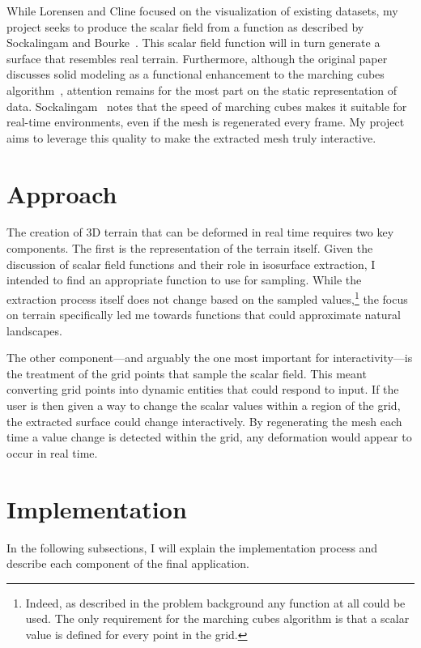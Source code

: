 \documentclass[pageno]{jpaper}
\begin{document}
While Lorensen and Cline focused on the visualization of existing datasets, my project seeks to produce the scalar field from a function as described by Sockalingam and Bourke~\cite{kieran,bourke}. This scalar field function will in turn generate a surface that resembles real terrain. Furthermore, although the original paper discusses solid modeling as a functional enhancement to the marching cubes algorithm~\cite{lorensen}, attention remains for the most part on the static representation of data. Sockalingam~\cite{kieran} notes that the speed of marching cubes makes it suitable for real-time environments, even if the mesh is regenerated every frame. My project aims to leverage this quality to make the extracted mesh truly interactive.

\section{Approach}

The creation of 3D terrain that can be deformed in real time requires two key components. The first is the representation of the terrain itself. Given the discussion of scalar field functions and their role in isosurface extraction, I intended to find an appropriate function to use for sampling. While the extraction process itself does not change based on the sampled values,\footnote{Indeed, as described in the problem background any function at all could be used. The only requirement for the marching cubes algorithm is that a scalar value is defined for every point in the grid.} the focus on terrain specifically led me towards functions that could approximate natural landscapes.

The other component—and arguably the one most important for interactivity—is the treatment of the grid points that sample the scalar field. This meant converting grid points into dynamic entities that could respond to input. If the user is then given a way to change the scalar values within a region of the grid, the extracted surface could change interactively. By regenerating the mesh each time a value change is detected within the grid, any deformation would appear to occur in real time.

\section{Implementation}

In the following subsections, I will explain the implementation process and describe each component of the final application.
\end{document}
